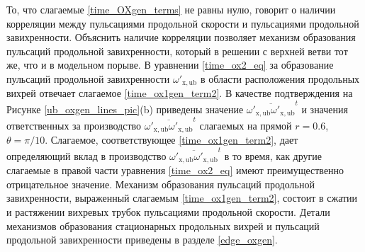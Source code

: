 То, что слагаемые \eqref{time_OXgen_terms} не равны нулю, говорит о наличии корреляции между пульсациями продольной скорости и пульсациями продольной завихренности. Объяснить наличие корреляции позволяет механизм образования пульсаций продольной завихренности, который в решении с верхней ветви тот же, что и в модельном порыве. В уравнении \eqref{time_ox2_eq} за образование пульсаций продольной завихренности $\omega'_\mathrm{x,ub}$ в области расположения продольных вихрей отвечает слагаемое \eqref{time_ox1gen_term2}. В качестве подтверждения на Рисунке \ref{ub_oxgen_lines_pic}(b) приведены значение $\overline{\omega'_\mathrm{x,ub}\omega'_\mathrm{x,ub}}^t$ и значения ответственных за производство $\overline{\omega'_\mathrm{x,ub}\omega'_\mathrm{x,ub}}^t$ слагаемых на прямой $r = 0.6$, $\theta = \pi/10$. Слагаемое, соответствующее \eqref{time_ox1gen_term2}, дает определяющий вклад в производство  $\overline{\omega'_\mathrm{x,ub}\omega'_\mathrm{x,ub}}^t$ в то время, как другие слагаемые в правой части уравнения \eqref{time_ox2_eq} имеют преимущественно отрицательное значение. Механизм образования пульсаций продольной завихренности, выраженный слагаемым \eqref{time_ox1gen_term2}, состоит в сжатии и растяжении вихревых трубок пульсациями продольной скорости. Детали механизмов образования стационарных продольных вихрей и пульсаций продольной завихренности приведены в разделе \ref{edge_oxgen}.

